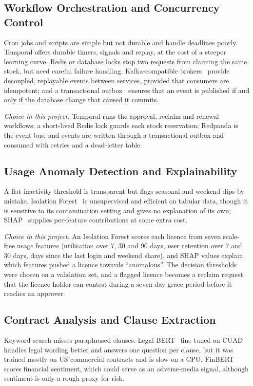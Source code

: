\subsection{Workflow Orchestration and Concurrency Control}
Cron jobs and scripts are simple but not durable and handle deadlines poorly. Temporal offers durable timers, signals and replay, at the cost of a steeper learning curve. Redis or database locks stop two requests from claiming the same stock, but need careful failure handling. Kafka-compatible brokers~\cite{kreps2011kafka} provide decoupled, replayable events between services, provided that consumers are idempotent; and a transactional outbox~\cite{richardson2018microservices} ensures that an event is published if and only if the database change that caused it commits.

\emph{Choice in this project.} Temporal runs the approval, reclaim and renewal workflows; a short-lived Redis lock guards each stock reservation; Redpanda is the event bus; and events are written through a transactional outbox and consumed with retries and a dead-letter table.

\subsection{Usage Anomaly Detection and Explainability}
A flat inactivity threshold is transparent but flags seasonal and weekend dips by mistake. Isolation Forest~\cite{liu2008isolation} is unsupervised and efficient on tabular data, though it is sensitive to its contamination setting and gives no explanation of its own; SHAP~\cite{lundberg2017shap} supplies per-feature contributions at some extra cost.

\emph{Choice in this project.} An Isolation Forest scores each licence from seven scale-free usage features (utilisation over 7, 30 and 90 days, user retention over 7 and 30 days, days since the last login and weekend share), and SHAP values explain which features pushed a licence towards ``anomalous''. The decision thresholds were chosen on a validation set, and a flagged licence becomes a reclaim request that the licence holder can contest during a seven-day grace period before it reaches an approver.

\subsection{Contract Analysis and Clause Extraction}
Keyword search misses paraphrased clauses. Legal-BERT~\cite{chalkidis2020legalbert} fine-tuned on CUAD~\cite{hendrycks2021cuad} handles legal wording better and answers one question per clause, but it was trained mostly on US commercial contracts and is slow on a CPU. FinBERT~\cite{araci2019finbert} scores financial sentiment, which could serve as an adverse-media signal, although sentiment is only a rough proxy for risk.

